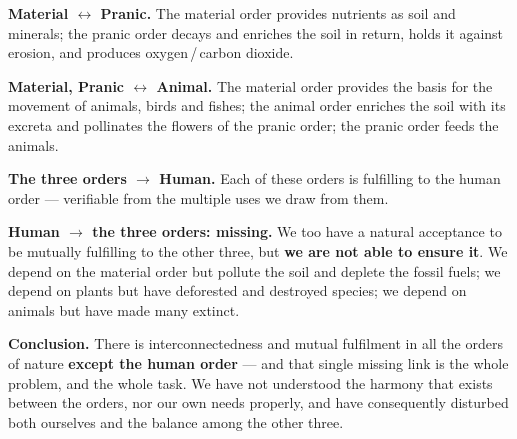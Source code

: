 \begin{apts}
\item \textbf{Material $\leftrightarrow$ Pranic.} The material order provides
      nutrients as soil and minerals; the pranic order decays and enriches the
      soil in return, holds it against erosion, and produces
      oxygen\,/\,carbon dioxide.
\item \textbf{Material, Pranic $\leftrightarrow$ Animal.} The material order
      provides the basis for the movement of animals, birds and fishes; the
      animal order enriches the soil with its excreta and pollinates the
      flowers of the pranic order; the pranic order feeds the animals.
\item \textbf{The three orders $\rightarrow$ Human.} Each of these orders is
      fulfilling to the human order --- verifiable from the multiple uses we
      draw from them.
\item \textbf{Human $\rightarrow$ the three orders: missing.} We too have a
      natural acceptance to be mutually fulfilling to the other three, but
      \textbf{we are not able to ensure it}. We depend on the material order
      but pollute the soil and deplete the fossil fuels; we depend on plants
      but have deforested and destroyed species; we depend on animals but have
      made many extinct.
\end{apts}

\textbf{Conclusion.} There is interconnectedness and mutual fulfilment in all
the orders of nature \textbf{except the human order} --- and that single
missing link is the whole problem, and the whole task. We have not understood
the harmony that exists between the orders, nor our own needs properly, and
have consequently disturbed both ourselves and the balance among the other
three.
